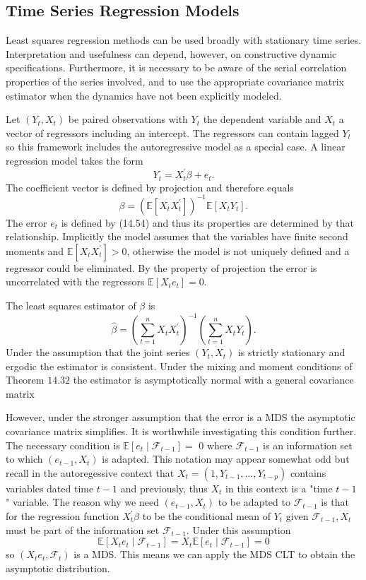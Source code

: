 \documentclass[10pt]{article}
\begin{document}
\subsection{Time Series Regression Models}
Least squares regression methods can be used broadly with stationary time series. Interpretation and usefulness can depend, however, on constructive dynamic specifications. Furthermore, it is necessary to be aware of the serial correlation properties of the series involved, and to use the appropriate covariance matrix estimator when the dynamics have not been explicitly modeled.

Let $\left(Y_{t}, X_{t}\right)$ be paired observations with $Y_{t}$ the dependent variable and $X_{t}$ a vector of regressors including an intercept. The regressors can contain lagged $Y_{t}$ so this framework includes the autoregressive model as a special case. A linear regression model takes the form
$$
Y_{t}=X_{t}^{\prime} \beta+e_{t} .
$$
The coefficient vector is defined by projection and therefore equals
$$
\beta=\left(\mathbb{E}\left[X_{t} X_{t}^{\prime}\right]\right)^{-1} \mathbb{E}\left[X_{t} Y_{t}\right] .
$$
The error $e_{t}$ is defined by (14.54) and thus its properties are determined by that relationship. Implicitly the model assumes that the variables have finite second moments and $\mathbb{E}\left[X_{t} X_{t}^{\prime}\right]>0$, otherwise the model is not uniquely defined and a regressor could be eliminated. By the property of projection the error is uncorrelated with the regressors $\mathbb{E}\left[X_{t} e_{t}\right]=0$.

The least squares estimator of $\beta$ is
$$
\widehat{\beta}=\left(\sum_{t=1}^{n} X_{t} X_{t}^{\prime}\right)^{-1}\left(\sum_{t=1}^{n} X_{t} Y_{t}\right) .
$$
Under the assumption that the joint series $\left(Y_{t}, X_{t}\right)$ is strictly stationary and ergodic the estimator is consistent. Under the mixing and moment conditions of Theorem $14.32$ the estimator is asymptotically normal with a general covariance matrix

However, under the stronger assumption that the error is a MDS the asymptotic covariance matrix simplifies. It is worthwhile investigating this condition further. The necessary condition is $\mathbb{E}\left[e_{t} \mid \mathscr{F}_{t-1}\right]=$ 0 where $\mathscr{F}_{t-1}$ is an information set to which $\left(e_{t-1}, X_{t}\right)$ is adapted. This notation may appear somewhat odd but recall in the autoregessive context that $X_{t}=\left(1, Y_{t-1}, \ldots, Y_{t-p}\right)$ contains variables dated time $t-1$ and previously, thus $X_{t}$ in this context is a "time $t-1$ " variable. The reason why we need $\left(e_{t-1}, X_{t}\right)$ to be adapted to $\mathscr{F}_{t-1}$ is that for the regression function $X_{t}^{\prime} \beta$ to be the conditional mean of $Y_{t}$ given $\mathscr{F}_{t-1}, X_{t}$ must be part of the information set $\mathscr{F}_{t-1}$. Under this assumption
$$
\mathbb{E}\left[X_{t} e_{t} \mid \mathscr{F}_{t-1}\right]=X_{t} \mathbb{E}\left[e_{t} \mid \mathscr{F}_{t-1}\right]=0
$$
so $\left(X_{t} e_{t}, \mathscr{F}_{t}\right)$ is a MDS. This means we can apply the MDS CLT to obtain the asymptotic distribution.
\end{document}
